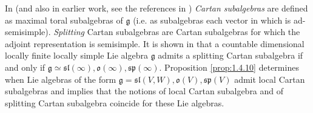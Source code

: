 \documentclass[10pt]{amsart}
\newcounter{theorem}
\newtheorem{lemma}[theo]{Lemma}
\renewenvironment{proof}{ \emph{Proof}}{$\Box$}
\renewcommand{\sp}{\mathfrak{sp}}
\renewcommand{\sl}{\mathfrak{sl}}
\newcommand{\oo}{\mathfrak{o}}
\newcommand{\hh}{\mathfrak{h}}
\renewcommand{\gg}{\mathfrak{g}}
\begin{document}

 
In \cite{DPSn} (and also in earlier work, see the references in
\cite{DPSn}) \textit{Cartan subalgebras} are 
defined as maximal toral subalgebras of $\gg$ 
(i.e. as subalgebras each vector in which is
ad-semisimple). \textit{Splitting} 
Cartan subalgebras are Cartan subalgebras for which the adjoint 
representation is semisimple. It is shown in \cite{pstr} that a
countable dimensional locally finite 
locally simple Lie algebra $\gg$ admits a splitting 
Cartan subalgebra if and only if $\gg \simeq \sl(\infty), \oo(\infty),
\sp(\infty)$. Proposition \ref{prop:1.4.10} determines when Lie algebras of the form $\gg = \sl(V,W), \oo(V), \sp(V)$ admit local Cartan subalgebras and implies that the notions of local Cartan subalgebra and of splitting Cartan subalgebra coincide for these Lie algebras. 

\vspace{0.33cm}
\end{document}
